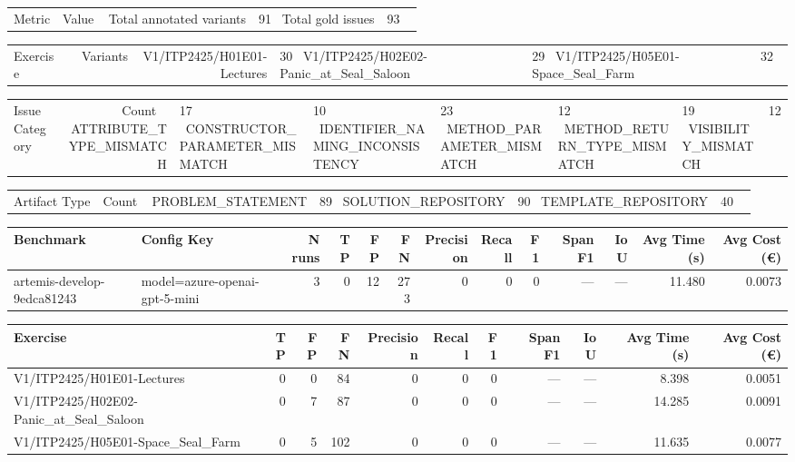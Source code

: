 \begin{tabular}{lr}
Metric & Value \
\hline
Total annotated variants & 91 \
Total gold issues & 93 \
\end{tabular}

\begin{tabular}{lr}
Exercise & Variants \
\hline
V1/ITP2425/H01E01-Lectures & 30 \
V1/ITP2425/H02E02-Panic\_at\_Seal\_Saloon & 29 \
V1/ITP2425/H05E01-Space\_Seal\_Farm & 32 \
\end{tabular}

\begin{tabular}{lr}
Issue Category & Count \
\hline
ATTRIBUTE\_TYPE\_MISMATCH & 17 \
CONSTRUCTOR\_PARAMETER\_MISMATCH & 10 \
IDENTIFIER\_NAMING\_INCONSISTENCY & 23 \
METHOD\_PARAMETER\_MISMATCH & 12 \
METHOD\_RETURN\_TYPE\_MISMATCH & 19 \
VISIBILITY\_MISMATCH & 12 \
\end{tabular}

\begin{tabular}{lr}
Artifact Type & Count \
\hline
PROBLEM\_STATEMENT & 89 \
SOLUTION\_REPOSITORY & 90 \
TEMPLATE\_REPOSITORY & 40 \
\end{tabular}

\begin{tabular}{llrrrrrrrrrrr}
Benchmark & Config Key & N runs & TP & FP & FN & Precision & Recall & F1 & Span F1 & IoU & Avg Time (s) & Avg Cost (€) \\
\hline
artemis-develop-9edca81243 & model=azure-openai-gpt-5-mini & 3 & 0 & 12 & 273 & 0 & 0 & 0 & — & — & 11.480 & 0.0073 \\
\end{tabular}

\begin{tabular}{lrrrrrrrrrr}
Exercise & TP & FP & FN & Precision & Recall & F1 & Span F1 & IoU & Avg Time (s) & Avg Cost (€) \\
\hline
V1/ITP2425/H01E01-Lectures & 0 & 0 & 84 & 0 & 0 & 0 & — & — & 8.398 & 0.0051 \\
V1/ITP2425/H02E02-Panic\_at\_Seal\_Saloon & 0 & 7 & 87 & 0 & 0 & 0 & — & — & 14.285 & 0.0091 \\
V1/ITP2425/H05E01-Space\_Seal\_Farm & 0 & 5 & 102 & 0 & 0 & 0 & — & — & 11.635 & 0.0077 \\
\end{tabular}
